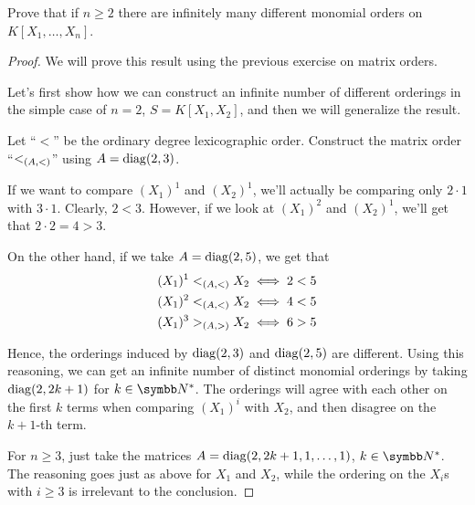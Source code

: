 
\begin{problem}
Prove that if \(n \geq 2\) there are infinitely many different monomial orders on \(K[X_1, \dots, X_n]\).
\end{problem}
\begin{proof}
We will prove this result using the previous exercise on matrix orders.

Let's first show how we can construct an infinite number of different orderings in the simple case of \(n = 2\), \(S = K[X_1, X_2]\), and then we will generalize the result.

Let ``\(<\)'' be the ordinary degree lexicographic order. Construct the matrix order ``\(<_{(A, <)}\)'' using \(A = \operatorname{diag}(2, 3)\).

If we want to compare \((X_1)^1\) and \((X_2)^1\), we'll actually be comparing only \(2 \cdot 1\) with \(3 \cdot 1\). Clearly, \(2 < 3\). However, if we look at \((X_1)^2\) and \((X_2)^1\), we'll get that \(2 \cdot 2 = 4 > 3\).

On the other hand, if we take \(A = \operatorname{diag}(2, 5)\), we get that
\begin{align*}
    (X_1)^1 <_{(A, <)} X_2 \iff 2 < 5 \\
    (X_1)^2 <_{(A, <)} X_2 \iff 4 < 5 \\
    (X_1)^3 >_{(A, >)} X_2 \iff 6 > 5
\end{align*}

Hence, the orderings induced by \(\operatorname{diag}(2, 3)\) and \(\operatorname{diag}(2, 5)\) are different. Using this reasoning, we can get an infinite number of distinct monomial orderings by taking \(\operatorname{diag}(2, 2k + 1)\) for \(k \in \naturals^*\). The orderings will agree with each other on the first \(k\) terms when comparing \((X_1)^i\) with \(X_2\), and then disagree on the \(k + 1\)-th term.

For \(n \geq 3\), just take the matrices \(A = \operatorname{diag}(2, 2k + 1, 1, \dots, 1)\), \(k \in \naturals^*\). The reasoning goes just as above for \(X_1\) and \(X_2\), while the ordering on the \(X_i\)s with \(i \geq 3\) is irrelevant to the conclusion.
\end{proof}

